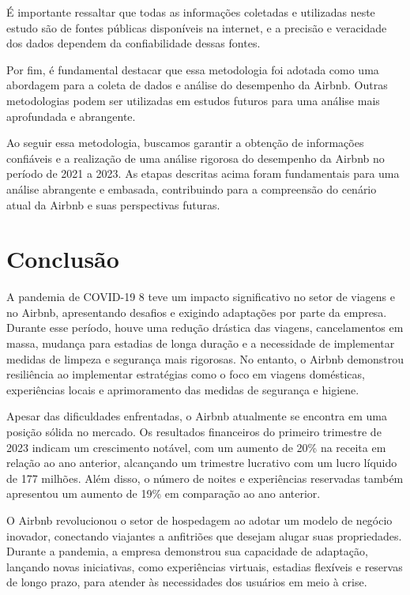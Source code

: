 \documentclass{article}
\begin{document}
É importante ressaltar que todas as informações coletadas e utilizadas neste estudo são de fontes públicas disponíveis na internet, e a precisão e veracidade dos dados dependem da confiabilidade dessas fontes.

Por fim, é fundamental destacar que essa metodologia foi adotada como uma abordagem para a coleta de dados e análise do desempenho da Airbnb. Outras metodologias podem ser utilizadas em estudos futuros para uma análise mais aprofundada e abrangente.

Ao seguir essa metodologia, buscamos garantir a obtenção de informações confiáveis e a realização de uma análise rigorosa do desempenho da Airbnb no período de 2021 a 2023. As etapas descritas acima foram fundamentais para uma análise abrangente e embasada, contribuindo para a compreensão do cenário atual da Airbnb e suas perspectivas futuras.
\newpage
\section*{Conclusão}
A pandemia de COVID-19 8 teve um impacto significativo no setor de viagens e no Airbnb, apresentando desafios e exigindo adaptações por parte da empresa. Durante esse período, houve uma redução drástica das viagens, cancelamentos em massa, mudança para estadias de longa duração e a necessidade de implementar medidas de limpeza e segurança mais rigorosas. No entanto, o Airbnb demonstrou resiliência ao implementar estratégias como o foco em viagens domésticas, experiências locais e aprimoramento das medidas de segurança e higiene.

Apesar das dificuldades enfrentadas, o Airbnb atualmente se encontra em uma posição sólida no mercado. Os resultados financeiros do primeiro trimestre de 2023 indicam um crescimento notável, com um aumento de 20\% na receita em relação ao ano anterior, alcançando um trimestre lucrativo com um lucro líquido de 177 milhões. Além disso, o número de noites e experiências reservadas também apresentou um aumento de 19\% em comparação ao ano anterior.

O Airbnb revolucionou o setor de hospedagem ao adotar um modelo de negócio inovador, conectando viajantes a anfitriões que desejam alugar suas propriedades. Durante a pandemia, a empresa demonstrou sua capacidade de adaptação, lançando novas iniciativas, como experiências virtuais, estadias flexíveis e reservas de longo prazo, para atender às necessidades dos usuários em meio à crise.
\end{document}
